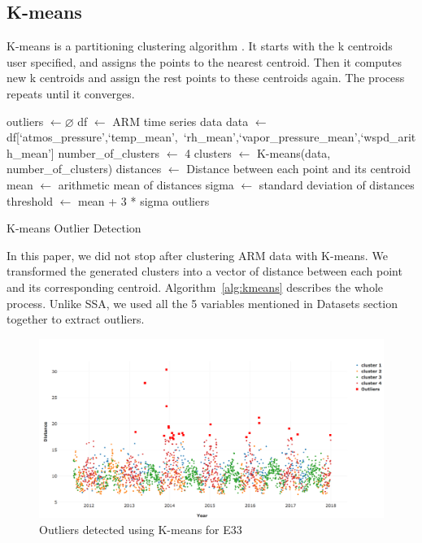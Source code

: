 \documentclass[letterpaper, 10 pt, conference]{ieeeconf}  %
\begin{document}
\subsection{K-means}
K-means is a partitioning clustering algorithm \cite{macqueen1967some, hartigan1979algorithm}. It starts with the k centroids user specified, and assigns the points to the nearest centroid. Then it computes new k centroids and assign the rest points to these centroids again. The process repeats until it converges. 

\begin{algorithm}[ht]
\DontPrintSemicolon
\SetAlgoLined
\BlankLine

outliers $\leftarrow \varnothing$\;
df $\leftarrow$ ARM time series data\;
data $\leftarrow$ df[`atmos\_pressure',`temp\_mean',\
`rh\_mean',`vapor\_pressure\_mean',`wspd\_arith\_mean']\;
number\_of\_clusters $\leftarrow$ 4\;
clusters $\leftarrow$ K-means(data, number\_of\_clusters)\;
distances $\leftarrow$ Distance between each point and its centroid\;
mean $\leftarrow$ arithmetic mean of distances\;
sigma $\leftarrow$ standard deviation of distances\;
threshold $\leftarrow$ mean + 3 * sigma\;
\Return outliers
\caption{K-means Outlier Detection}\label{alg:kmeans}
\end{algorithm}

In this paper, we did not stop after clustering ARM data with K-means. We transformed the generated clusters into a vector of distance between each point and its corresponding centroid. Algorithm~\ref{alg:kmeans} describes the whole process. Unlike SSA, we used all the 5 variables mentioned in Datasets section together to extract outliers.

\begin{figure}[ht]
    \centering
    \includegraphics[width=\textwidth]{kmeans.png}
    \caption{Outliers detected using K-means for E33}
    \label{fig:kmeans}
\end{figure}
\end{document}
